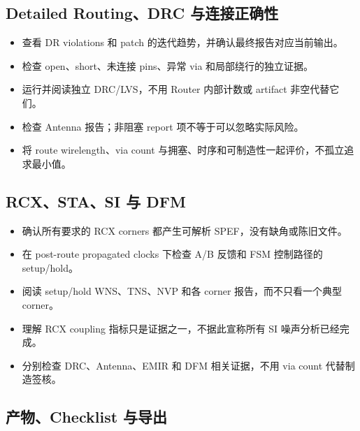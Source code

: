 \documentclass[UTF8,a4paper,11pt,fontset=fandol]{ctexart}
\begin{document}
\subsection{Detailed Routing、DRC 与连接正确性}

\begin{itemize}[leftmargin=2em]
  \item[$\square$] 查看 DR violations 和 patch 的迭代趋势，并确认最终报告对应当前输出。
  \item[$\square$] 检查 open、short、未连接 pins、异常 via 和局部绕行的独立证据。
  \item[$\square$] 运行并阅读独立 DRC/LVS，不用 Router 内部计数或 artifact 非空代替它们。
  \item[$\square$] 检查 Antenna 报告；非阻塞 report 项不等于可以忽略实际风险。
  \item[$\square$] 将 route wirelength、via count 与拥塞、时序和可制造性一起评价，不孤立追求最小值。
\end{itemize}

\subsection{RCX、STA、SI 与 DFM}

\begin{itemize}[leftmargin=2em]
  \item[$\square$] 确认所有要求的 RCX corners 都产生可解析 SPEF，没有缺角或陈旧文件。
  \item[$\square$] 在 post-route propagated clocks 下检查 A/B 反馈和 FSM 控制路径的 setup/hold。
  \item[$\square$] 阅读 setup/hold WNS、TNS、NVP 和各 corner 报告，而不只看一个典型 corner。
  \item[$\square$] 理解 RCX coupling 指标只是证据之一，不据此宣称所有 SI 噪声分析已经完成。
  \item[$\square$] 分别检查 DRC、Antenna、EMIR 和 DFM 相关证据，不用 via count 代替制造签核。
\end{itemize}

\subsection{产物、Checklist 与导出}
\end{document}
